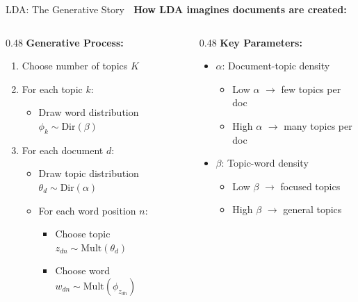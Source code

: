 \documentclass[aspectratio=169]{beamer}
\begin{document}
\begin{frame}[shrink=10]{LDA: The Generative Story 📖}
\textbf{How LDA imagines documents are created:}

\vspace{1em}

\begin{columns}[T]
\begin{column}{0.48\textwidth}
\textbf{Generative Process:}
\begin{enumerate}\setlength{\itemsep}{0pt}
    \item Choose number of topics $K$
    \item For each topic $k$:
    \begin{itemize}\setlength{\itemsep}{0pt}
        \item Draw word distribution $\phi_k \sim \text{Dir}(\beta)$
    \end{itemize}
    \item For each document $d$:
    \begin{itemize}\setlength{\itemsep}{0pt}
        \item Draw topic distribution $\theta_d \sim \text{Dir}(\alpha)$
        \item For each word position $n$:
        \begin{itemize}\setlength{\itemsep}{0pt}
            \item Choose topic $z_{dn} \sim \text{Mult}(\theta_d)$
            \item Choose word $w_{dn} \sim \text{Mult}(\phi_{z_{dn}})$
        \end{itemize}
    \end{itemize}
\end{enumerate}
\end{column}

\begin{column}{0.48\textwidth}
\textbf{Key Parameters:}
\begin{itemize}\setlength{\itemsep}{0pt}
    \item $\alpha$: Document-topic density
    \begin{itemize}\setlength{\itemsep}{0pt}
        \item Low $\alpha$ $\rightarrow$ few topics per doc
        \item High $\alpha$ $\rightarrow$ many topics per doc
    \end{itemize}
    \item $\beta$: Topic-word density
    \begin{itemize}\setlength{\itemsep}{0pt}
        \item Low $\beta$ $\rightarrow$ focused topics
        \item High $\beta$ $\rightarrow$ general topics
    \end{itemize}
\end{itemize}


\end{column}
\end{columns}
\end{frame}
\end{document}

